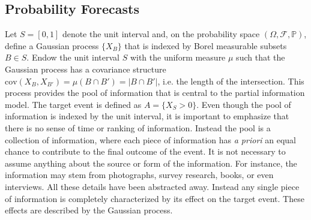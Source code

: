 \documentclass[11pt,twoside]{article}
\renewcommand{\P}{\mathbb{P}}
\theoremstyle{definition}
\theoremstyle{definition}
\begin{document}
\subsection{Probability Forecasts}
\label{Model}
Let $S = [0,1]$ denote the unit interval and, on the probability space $(\Omega, \mathcal{F}, \P)$, define a Gaussian process $\{ X_B \}$ that is indexed by Borel measurable subsets $B \in S$. Endow the unit interval $S$ with the uniform measure $\mu$ such that the Gaussian process has a covariance structure $\text{cov}(X_B, X_{B'}) = \mu(B \cap B') = |B \cap B'|$, i.e. the length of the intersection. This process provides the pool of information that is central to the partial information model. The target event is defined as $A = \{ X_{S} > 0\}$. Even though the pool of information is indexed by the unit interval, it is important to emphasize that there is no sense of time or ranking of information. Instead the pool is a collection of information, where each piece of information has \textit{a priori} an equal chance to contribute to the final outcome of the event. It is not necessary to assume anything about the source or form of the information. For instance, the information may stem from photographs, survey research, books, or even interviews. All these details have been abstracted away. Instead any single piece of information is completely characterized by its effect on the target event. These effects are described by the Gaussian process.
\end{document}
